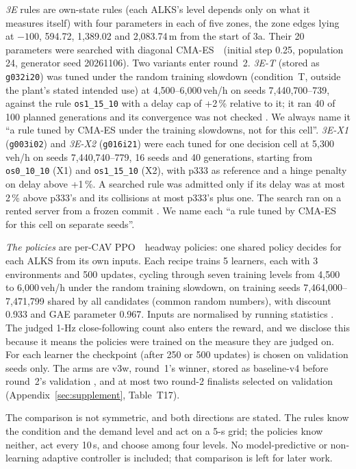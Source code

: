 \emph{3E} rules are own-state rules (each ALKS's level depends only on what it measures itself) with four parameters in each of five zones, the zone edges lying at $-100$, 594.72, 1,389.02 and 2,083.74\,m from the start of 3a.
Their 20 parameters were searched with diagonal CMA-ES~\autocite{Hansen2001,Ros2008}\verify\ (initial step 0.25, population 24, generator seed 20261106).
Two variants enter round~2.
\emph{3E-T} (stored as \texttt{g032i20}) was tuned under the random training slowdown (condition~T, outside the plant's stated intended use) at 4,500--6,000\,veh/h on seeds 7,440,700--739, against the rule \texttt{os1\_15\_10} with a delay cap of +2\,\% relative to it; it ran 40 of 100 planned generations and its convergence was not checked .
We always name it ``a rule tuned by CMA-ES under the training slowdowns, not for this cell''.
\emph{3E-X1} (\texttt{g003i02}) and \emph{3E-X2} (\texttt{g016i21}) were each tuned for one decision cell at 5,300\,veh/h on seeds 7,440,740--779, 16 seeds and 40 generations, starting from \texttt{os0\_10\_10} (X1) and \texttt{os1\_15\_10} (X2), with p333 as reference and a hinge penalty on delay above +1\,\%.
A searched rule was admitted only if its delay was at most 2\,\% above p333's and its collisions at most p333's plus one.
The search ran on a rented server from a frozen commit .
We name each ``a rule tuned by CMA-ES for this cell on separate seeds''.

\emph{The policies} are per-CAV PPO~\autocite{Schulman2017}\verify\ headway policies: one shared policy decides for each ALKS from its own inputs.
Each recipe trains 5 learners, each with 3 environments and 500 updates, cycling through seven training levels from 4,500 to 6,000\,veh/h under the random training slowdown, on training seeds 7,464,000--7,471,799 shared by all candidates (common random numbers), with discount 0.933 and GAE parameter 0.967.
Inputs are normalised by running statistics .
The judged 1-Hz close-following count also enters the reward, and we disclose this because it means the policies were trained on the measure they are judged on.
For each learner the checkpoint (after 250 or 500 updates) is chosen on validation seeds only.
The arms are v3w, round~1's winner, stored as baseline-v4 before round~2's validation , and at most two round-2 finalists selected on validation (Appendix~\ref{sec:supplement}, Table~T17).

The comparison is not symmetric, and both directions are stated.
The rules know the condition and the demand level and act on a 5-s grid; the policies know neither, act every 10\,s, and choose among four levels.
No model-predictive or non-learning adaptive controller is included; that comparison is left for later work.

